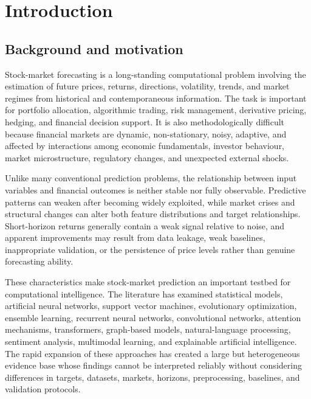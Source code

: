 \documentclass[pdflatex,sn-mathphys-num]{sn-jnl}%
\theoremstyle{thmstyleone}%
\theoremstyle{thmstyletwo}%
\theoremstyle{thmstylethree}%
\begin{document}
\maketitle


\section{Introduction}\label{sec1} 
\subsection{Background and motivation} 
Stock-market forecasting is a long-standing computational problem involving
the estimation of future prices, returns, directions, volatility, trends, and
market regimes from historical and contemporaneous information. The task is
important for portfolio allocation, algorithmic trading, risk management,
derivative pricing, hedging, and financial decision support. It is also
methodologically difficult because financial markets are dynamic,
non-stationary, noisy, adaptive, and affected by interactions among economic
fundamentals, investor behaviour, market microstructure, regulatory changes,
and unexpected external shocks.

Unlike many conventional prediction problems, the relationship between input
variables and financial outcomes is neither stable nor fully observable.
Predictive patterns can weaken after becoming widely exploited, while market
crises and structural changes can alter both feature distributions and target
relationships. Short-horizon returns generally contain a weak signal relative
to noise, and apparent improvements may result from data leakage, weak
baselines, inappropriate validation, or the persistence of price levels rather
than genuine forecasting ability.

These characteristics make stock-market prediction an important testbed for
computational intelligence. The literature has examined statistical models,
artificial neural networks, support vector machines, evolutionary
optimization, ensemble learning, recurrent neural networks, convolutional
networks, attention mechanisms, transformers, graph-based models,
natural-language processing, sentiment analysis, multimodal learning, and
explainable artificial intelligence. The rapid expansion of these approaches
has created a large but heterogeneous evidence base whose findings cannot be
interpreted reliably without considering differences in targets, datasets,
markets, horizons, preprocessing, baselines, and validation protocols.
\end{document}
